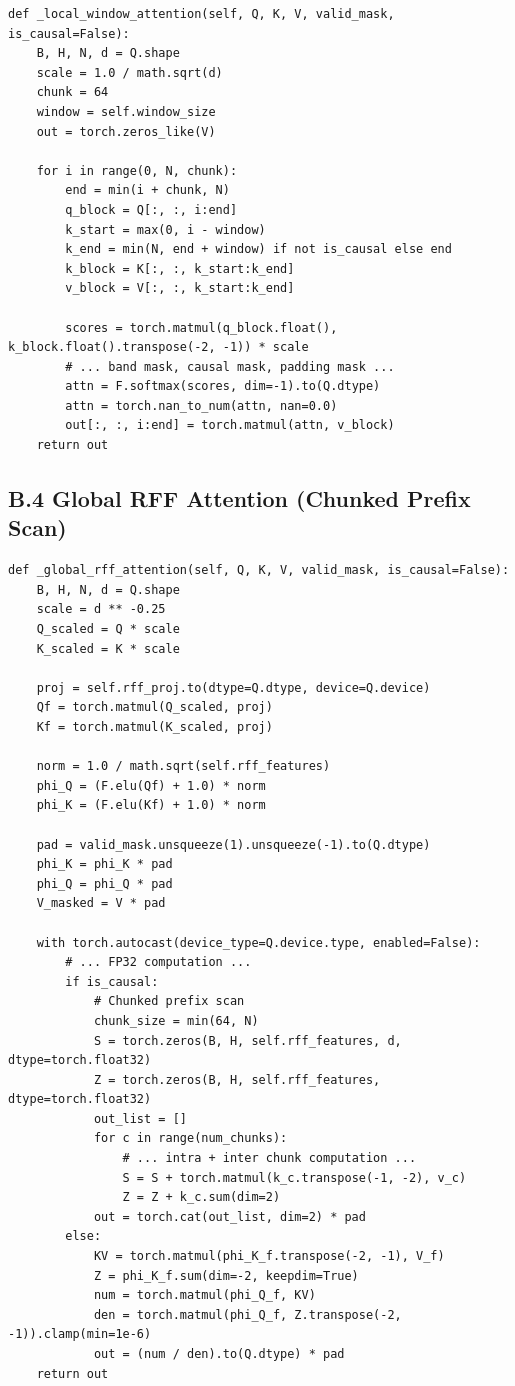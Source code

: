 \begin{lstlisting}
def _local_window_attention(self, Q, K, V, valid_mask, is_causal=False):
    B, H, N, d = Q.shape
    scale = 1.0 / math.sqrt(d)
    chunk = 64
    window = self.window_size
    out = torch.zeros_like(V)
    
    for i in range(0, N, chunk):
        end = min(i + chunk, N)
        q_block = Q[:, :, i:end]
        k_start = max(0, i - window)
        k_end = min(N, end + window) if not is_causal else end
        k_block = K[:, :, k_start:k_end]
        v_block = V[:, :, k_start:k_end]
        
        scores = torch.matmul(q_block.float(), k_block.float().transpose(-2, -1)) * scale
        # ... band mask, causal mask, padding mask ...
        attn = F.softmax(scores, dim=-1).to(Q.dtype)
        attn = torch.nan_to_num(attn, nan=0.0)
        out[:, :, i:end] = torch.matmul(attn, v_block)
    return out
\end{lstlisting}

\subsection{B.4 Global RFF Attention (Chunked Prefix Scan)}

\begin{lstlisting}
def _global_rff_attention(self, Q, K, V, valid_mask, is_causal=False):
    B, H, N, d = Q.shape
    scale = d ** -0.25
    Q_scaled = Q * scale
    K_scaled = K * scale
    
    proj = self.rff_proj.to(dtype=Q.dtype, device=Q.device)
    Qf = torch.matmul(Q_scaled, proj)
    Kf = torch.matmul(K_scaled, proj)
    
    norm = 1.0 / math.sqrt(self.rff_features)
    phi_Q = (F.elu(Qf) + 1.0) * norm
    phi_K = (F.elu(Kf) + 1.0) * norm
    
    pad = valid_mask.unsqueeze(1).unsqueeze(-1).to(Q.dtype)
    phi_K = phi_K * pad
    phi_Q = phi_Q * pad
    V_masked = V * pad
    
    with torch.autocast(device_type=Q.device.type, enabled=False):
        # ... FP32 computation ...
        if is_causal:
            # Chunked prefix scan
            chunk_size = min(64, N)
            S = torch.zeros(B, H, self.rff_features, d, dtype=torch.float32)
            Z = torch.zeros(B, H, self.rff_features, dtype=torch.float32)
            out_list = []
            for c in range(num_chunks):
                # ... intra + inter chunk computation ...
                S = S + torch.matmul(k_c.transpose(-1, -2), v_c)
                Z = Z + k_c.sum(dim=2)
            out = torch.cat(out_list, dim=2) * pad
        else:
            KV = torch.matmul(phi_K_f.transpose(-2, -1), V_f)
            Z = phi_K_f.sum(dim=-2, keepdim=True)
            num = torch.matmul(phi_Q_f, KV)
            den = torch.matmul(phi_Q_f, Z.transpose(-2, -1)).clamp(min=1e-6)
            out = (num / den).to(Q.dtype) * pad
    return out
\end{lstlisting}

